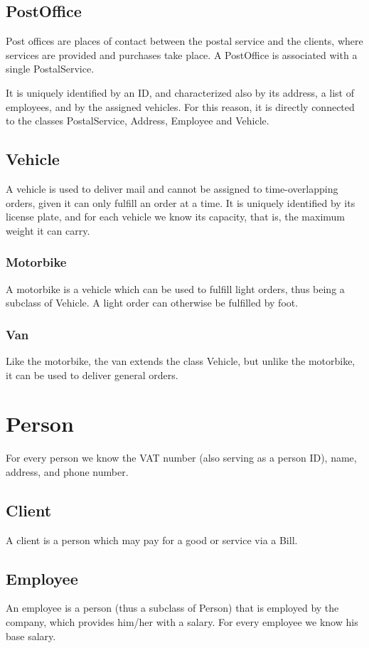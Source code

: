\documentclass{article}[a4paper]
\theoremstyle{remark}
\begin{document}
\subsection{PostOffice}
Post offices are places of contact between the postal service and the clients, where services are provided and purchases take place. A PostOffice is associated with a single PostalService.\par
It is uniquely identified by an ID, and characterized also by its address, a list of employees, and by the assigned vehicles. For this reason, it is directly connected to the classes PostalService, Address, Employee and Vehicle.
\subsection{Vehicle}
A vehicle is used to deliver mail and cannot be assigned to time-overlapping orders, given it can only fulfill an order at a time. It is uniquely identified by its license plate, and for each vehicle we know its capacity, that is, the maximum weight it can carry.
\subsubsection{Motorbike}
A motorbike is a vehicle which can be used to fulfill light orders, thus being a subclass of Vehicle. A light order can otherwise be fulfilled by foot.
\subsubsection{Van}
Like the motorbike, the van extends the class Vehicle, but unlike the motorbike, it can be used to deliver general orders.
\section{Person}
For every person we know the VAT number (also serving as a person ID), name, address, and phone number.
\subsection{Client}
A client is a person which may pay for a good or service via a Bill.
\subsection{Employee}
An employee is a person (thus a subclass of Person) that is employed by the company, which provides him/her with a salary. For every employee we know his base salary.
\end{document}
